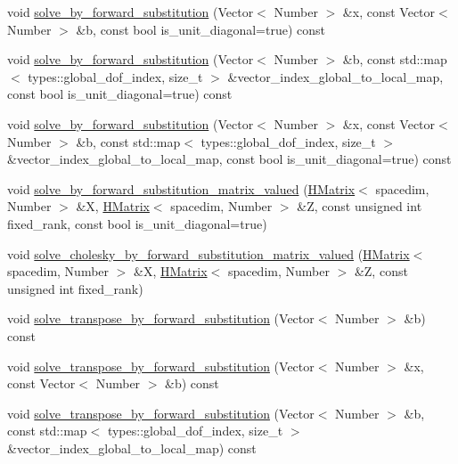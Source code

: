\begin{DoxyCompactItemize}
\item 
void \hyperlink{classHMatrix_a4c226aaa96ad7b1a7f0c1507d43bba89}{solve\+\_\+by\+\_\+forward\+\_\+substitution} (Vector$<$ Number $>$ \&x, const Vector$<$ Number $>$ \&b, const bool is\+\_\+unit\+\_\+diagonal=true) const
\item 
void \hyperlink{classHMatrix_a898ed2cdcb0351a6a9b57251320b5d1d}{solve\+\_\+by\+\_\+forward\+\_\+substitution} (Vector$<$ Number $>$ \&b, const std\+::map$<$ types\+::global\+\_\+dof\+\_\+index, size\+\_\+t $>$ \&vector\+\_\+index\+\_\+global\+\_\+to\+\_\+local\+\_\+map, const bool is\+\_\+unit\+\_\+diagonal=true) const
\item 
void \hyperlink{classHMatrix_a5ddd48bc33e45d0b4221416cbb039cc3}{solve\+\_\+by\+\_\+forward\+\_\+substitution} (Vector$<$ Number $>$ \&x, const Vector$<$ Number $>$ \&b, const std\+::map$<$ types\+::global\+\_\+dof\+\_\+index, size\+\_\+t $>$ \&vector\+\_\+index\+\_\+global\+\_\+to\+\_\+local\+\_\+map, const bool is\+\_\+unit\+\_\+diagonal=true) const
\item 
void \hyperlink{classHMatrix_a20fa0ad9c55bb5225440ccab58608cf8}{solve\+\_\+by\+\_\+forward\+\_\+substitution\+\_\+matrix\+\_\+valued} (\hyperlink{classHMatrix}{H\+Matrix}$<$ spacedim, Number $>$ \&X, \hyperlink{classHMatrix}{H\+Matrix}$<$ spacedim, Number $>$ \&Z, const unsigned int fixed\+\_\+rank, const bool is\+\_\+unit\+\_\+diagonal=true)
\item 
void \hyperlink{classHMatrix_a948b0b53490cc7614ee82fec80fa245a}{solve\+\_\+cholesky\+\_\+by\+\_\+forward\+\_\+substitution\+\_\+matrix\+\_\+valued} (\hyperlink{classHMatrix}{H\+Matrix}$<$ spacedim, Number $>$ \&X, \hyperlink{classHMatrix}{H\+Matrix}$<$ spacedim, Number $>$ \&Z, const unsigned int fixed\+\_\+rank)
\item 
void \hyperlink{classHMatrix_a624fc153099a20572a655457d4f81b70}{solve\+\_\+transpose\+\_\+by\+\_\+forward\+\_\+substitution} (Vector$<$ Number $>$ \&b) const
\item 
void \hyperlink{classHMatrix_a94f9bb1bc4e584fc5f29541be6b85ef1}{solve\+\_\+transpose\+\_\+by\+\_\+forward\+\_\+substitution} (Vector$<$ Number $>$ \&x, const Vector$<$ Number $>$ \&b) const
\item 
void \hyperlink{classHMatrix_aefa73f541d0b5eb8cddde5386fd140d0}{solve\+\_\+transpose\+\_\+by\+\_\+forward\+\_\+substitution} (Vector$<$ Number $>$ \&b, const std\+::map$<$ types\+::global\+\_\+dof\+\_\+index, size\+\_\+t $>$ \&vector\+\_\+index\+\_\+global\+\_\+to\+\_\+local\+\_\+map) const
\item 

\end{DoxyCompactItemize}
